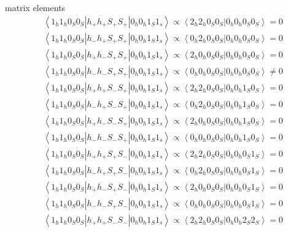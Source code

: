matrix elements\\

\begin{equation}
  \begin{split}
    &\left \langle 1_h 1_h 0_S 0_S | h_+ h_+ S_+ S_+|0_h 0_h 1_S 1_s\right\rangle \propto \left \langle 2_h 2_h 0_S 0_S|0_h 0_h 0_S 0_S\right \rangle=0\\
    &\left \langle 1_h 1_h 0_S 0_S | h_- h_+ S_+ S_+|0_h 0_h 1_S 1_s\right\rangle \propto \left \langle 0_h 2_h 0_S 0_S|0_h 0_h 0_S 0_S\right \rangle=0\\
    &\left \langle 1_h 1_h 0_S 0_S | h_+ h_- S_+ S_+|0_h 0_h 1_S 1_s\right\rangle \propto \left \langle 2_h 0_h 0_S 0_S|0_h 0_h 0_S 0_S\right \rangle=0\\
    &\left \langle 1_h 1_h 0_S 0_S | h_- h_- S_+ S_+|0_h 0_h 1_S 1_s\right\rangle \propto \left \langle 0_h 0_h 0_S 0_S|0_h 0_h 0_S 0_S\right \rangle\neq 0\\
    &\left \langle 1_h 1_h 0_S 0_S | h_+ h_+ S_- S_+|0_h 0_h 1_S 1_s\right\rangle \propto \left \langle 2_h 2_h 0_S 0_S|0_h 0_h 1_S 0_S\right \rangle=0\\
    &\left \langle 1_h 1_h 0_S 0_S | h_- h_+ S_- S_+|0_h 0_h 1_S 1_s\right\rangle \propto \left \langle 0_h 2_h 0_S 0_S|0_h 0_h 1_S 0_S\right \rangle=0\\
    &\left \langle 1_h 1_h 0_S 0_S | h_+ h_- S_- S_+|0_h 0_h 1_S 1_s\right\rangle \propto \left \langle 2_h 0_h 0_S 0_S|0_h 0_h 1_S 0_S\right \rangle=0\\
    &\left \langle 1_h 1_h 0_S 0_S | h_- h_- S_- S_+|0_h 0_h 1_S 1_s\right\rangle \propto \left \langle 0_h 0_h 0_S 0_S|0_h 0_h 1_S 0_S\right \rangle=0\\
    &\left \langle 1_h 1_h 0_S 0_S | h_+ h_+ S_+ S_-|0_h 0_h 1_S 1_s\right\rangle \propto \left \langle 2_h 2_h 0_S 0_S|0_h 0_h 0_S 1_S\right \rangle=0\\
    &\left \langle 1_h 1_h 0_S 0_S | h_- h_+ S_+ S_-|0_h 0_h 1_S 1_s\right\rangle \propto \left \langle 0_h 2_h 0_S 0_S|0_h 0_h 0_S 1_S\right \rangle=0\\
    &\left \langle 1_h 1_h 0_S 0_S | h_+ h_- S_+ S_-|0_h 0_h 1_S 1_s\right\rangle \propto \left \langle 2_h 0_h 0_S 0_S|0_h 0_h 0_S 1_S\right \rangle=0\\
    &\left \langle 1_h 1_h 0_S 0_S | h_- h_- S_+ S_-|0_h 0_h 1_S 1_s\right\rangle \propto \left \langle 0_h 0_h 0_S 0_S|0_h 0_h 0_S 1_S\right \rangle=0\\
    &\left \langle 1_h 1_h 0_S 0_S | h_+ h_+ S_- S_-|0_h 0_h 1_S 1_s\right\rangle \propto \left \langle 2_h 2_h 0_S 0_S|0_h 0_h 2_S 2_S\right \rangle=0\\

\end{split}
\end{equation}
